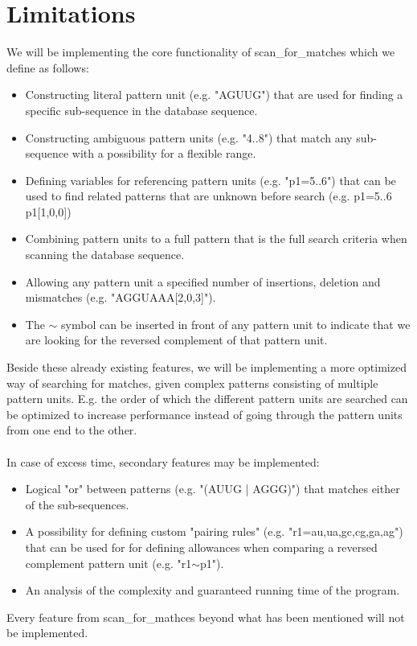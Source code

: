 \documentclass[12pt]{article}
\begin{document}
\section{Limitations}
We will be implementing the core functionality of scan\_for\_matches which we define as follows: \\ 
\begin{itemize}
\item Constructing literal pattern unit (e.g. "AGUUG") that are used for finding a specific sub-sequence in the 
database sequence.
\item Constructing ambiguous pattern units (e.g. "4..8") that match any sub-sequence with a possibility for a 
flexible range.
\item Defining variables for referencing pattern units (e.g. "p1=5..6") that can be used 
to find related patterns that are unknown before search (e.g. p1=5..6 p1[1,0,0])
\item Combining pattern units to a full pattern that is the full search criteria when scanning the database sequence.
\item Allowing any pattern unit a specified number of insertions, deletion and mismatches (e.g. "AGGUAAA[2,0,3]").
\item The $\sim$ symbol can be inserted in front of any pattern unit to indicate that we are looking for the reversed
complement of that pattern unit.
\end{itemize}
Beside these already existing features, we will be implementing a more optimized way of searching for matches, given
complex patterns consisting of multiple pattern units. E.g. the order of which the different pattern units are searched
can be optimized to increase performance instead of going through the pattern units from one end to the other. \\ \\
In case of excess time, secondary features may be implemented: \\
\begin{itemize}
\item Logical "or" between patterns (e.g. "(AUUG | AGGG)") that matches either of the sub-sequences.
\item A possibility for defining custom "pairing rules" (e.g. "r1={au,ua,gc,cg,ga,ag}") that can be used for 
for defining allowances when comparing a reversed complement pattern unit (e.g. "r1$\sim$p1").
\item An analysis of the complexity and guaranteed running time of the program.
\end{itemize}
Every feature from scan\_for\_mathces beyond what has been mentioned will not be implemented.
\end{document}
